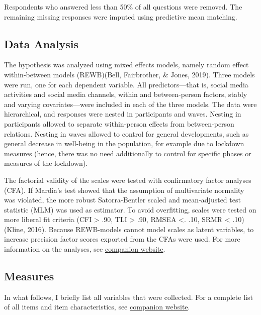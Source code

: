 \documentclass[
  english,
  man,mask,floatsintext]{apa6}
\begin{document}
Respondents who answered less than 50\% of all questions were removed.
The remaining missing responses were imputed using predictive mean matching.

\hypertarget{data-analysis}{%
\subsection{Data Analysis}\label{data-analysis}}

The hypothesis was analyzed using mixed effects models, namely random effect within-between models (REWB)(Bell, Fairbrother, \& Jones, 2019).
Three models were run, one for each dependent variable.
All predictors---that is, social media activities and social media channels, within and between-person factors, stably and varying covariates---were included in each of the three models.
The data were hierarchical, and responses were nested in participants and waves.
Nesting in participants allowed to separate within-person effects from between-person relations.
Nesting in waves allowed to control for general developments, such as general decrease in well-being in the population, for example due to lockdown measures (hence, there was no need additionally to control for specific phases or measures of the lockdown).

The factorial validity of the scales were tested with confirmatory factor analyses (CFA).
If Mardia's test showed that the assumption of multivariate normality was violated, the more robust Satorra-Bentler scaled and mean-adjusted test statistic (MLM) was used as estimator.
To avoid overfitting, scales were tested on more liberal fit criteria (CFI \textgreater{} .90, TLI \textgreater{} .90, RMSEA \textless. .10, SRMR \textless{} .10) (Kline, 2016).
Because REWB-models cannot model scales as latent variables, to increase precision factor scores exported from the CFAs were used.
For more information on the analyses, see \href{https://xmtra.github.io/Austrian_Corona_Panel_Project/index.html}{companion website}.

\hypertarget{measures}{%
\subsection{Measures}\label{measures}}

In what follows, I briefly list all variables that were collected.
For a complete list of all items and item characteristics, see \href{https://xmtra.github.io/Austrian_Corona_Panel_Project/index.html}{companion website}.
\end{document}
